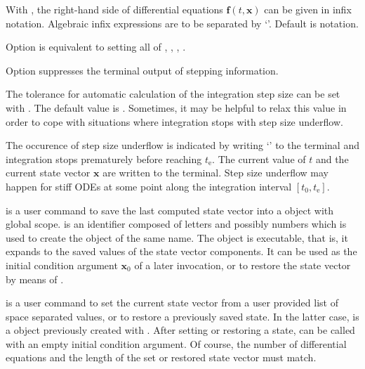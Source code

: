 \documentclass[11pt,english,BCOR10mm,DIV12,bibliography=totoc,parskip=false,smallheadings
    headexclude,footexclude,oneside,dvips,UKenglish]{pst-doc}
\begin{document}
With , the right-hand side of differential equations $\mathbf{f}(t,\mathbf{x})$ can be given in infix notation. Algebraic infix expressions are to be separated by `\Lkeyword{|}'. Default is \PS{} notation.

Option  is equivalent to setting all of , , , .

Option  suppresses the terminal output of stepping information.

The tolerance for automatic calculation of the integration step size can be set with  \Lkeyword{=}. The default value is . Sometimes, it may be helpful to relax this value in order to cope with situations where integration stops with step size underflow.

The occurence of step size underflow is indicated by writing `\Lkeyword{!}' to the terminal and integration stops prematurely before reaching $t_\mathrm{e}$. The current value of $t$ and the current state vector $\mathbf{x}$ are written to the terminal. Step size underflow may happen for stiff ODEs at some point along the integration interval $[t_0, t_\mathrm{e}]$.\\[1ex]

\begin{BDef}
\end{BDef}
is a user command to save the last computed state vector into a \PS{} object with global scope.  is an identifier composed of letters and possibly numbers which is used to create the \PS{} object of the same name. The object is executable, that is, it expands to the saved values of the state vector components. It can be used as the initial condition argument $\mathbf{x}_0$ of a later  invocation, or to restore the state vector by means of .\\[1ex]

\begin{BDef}
\end{BDef}
is a user command to set the current state vector from a user provided list of space separated values, or to restore a previously saved state. In the latter case,  is a \PS{} object previously created with . After setting or restoring a state,  can be called with an empty initial condition argument. Of course, the number of differential equations and the length of the set or restored state vector must match.
\end{document}
